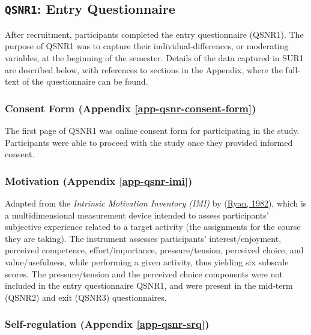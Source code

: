\documentclass[letterpaper, nobind]{templates/ociamthesis}
\begin{document}
\hypertarget{sec-method-qsnr1}{%
\subsection{\texorpdfstring{\texttt{QSNR1}: Entry Questionnaire}{QSNR1: Entry Questionnaire}}\label{sec-method-qsnr1}}

After recruitment, participants completed the entry questionnaire (QSNR1).
The purpose of QSNR1 was to capture their individual-differences, or
moderating variables, at the beginning of the semester.
Details of the data captured in SUR1 are
described below, with references to sections in the Appendix, where the
full-text of the questionnaire can be found.

\hypertarget{consent-form-appendix-refapp-qsnr-consent-form}{%
\subsubsection{Consent Form (Appendix \ref{app-qsnr-consent-form})}\label{consent-form-appendix-refapp-qsnr-consent-form}}

The first page of QSNR1 was online consent form for participating in the study. Participants
were able to proceed with the study once they provided informed consent.

\hypertarget{motivation-appendix-refapp-qsnr-imi}{%
\subsubsection{Motivation (Appendix \ref{app-qsnr-imi})}\label{motivation-appendix-refapp-qsnr-imi}}

Adapted from the \emph{Intrinsic Motivation Inventory (IMI)} by
(\protect\hyperlink{ref-ryan1982control}{Ryan, 1982}), which is a multidimensional measurement device
intended to assess participants' subjective experience related to a
target activity (the assignments for the course they are taking).
The instrument assesses participants' interest/enjoyment, perceived
competence, effort/importance, pressure/tension, perceived choice,
and value/usefulness, while performing a given activity, thus
yielding six subscale scores.
The pressure/tension and the perceived
choice components were not included in the entry questionnaire QSNR1, and were
present in the mid-term (QSNR2) and exit (QSNR3) questionnaires.

\hypertarget{self-regulation-appendix-refapp-qsnr-srq}{%
\subsubsection{Self-regulation (Appendix \ref{app-qsnr-srq})}\label{self-regulation-appendix-refapp-qsnr-srq}}
\end{document}
